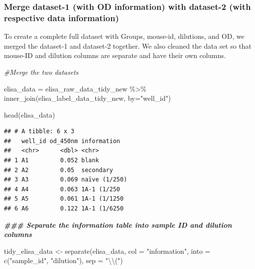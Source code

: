 \documentclass[
]{book}
\newenvironment{Shaded}{\begin{snugshade}}{\end{snugshade}}
\newcommand{\AttributeTok}[1]{\textcolor[rgb]{0.77,0.63,0.00}{#1}}
\newcommand{\CommentTok}[1]{\textcolor[rgb]{0.56,0.35,0.01}{\textit{#1}}}
\newcommand{\DocumentationTok}[1]{\textcolor[rgb]{0.56,0.35,0.01}{\textbf{\textit{#1}}}}
\newcommand{\FunctionTok}[1]{\textcolor[rgb]{0.00,0.00,0.00}{#1}}
\newcommand{\NormalTok}[1]{#1}
\newcommand{\OtherTok}[1]{\textcolor[rgb]{0.56,0.35,0.01}{#1}}
\newcommand{\SpecialCharTok}[1]{\textcolor[rgb]{0.00,0.00,0.00}{#1}}
\newcommand{\StringTok}[1]{\textcolor[rgb]{0.31,0.60,0.02}{#1}}
\begin{document}
\hypertarget{merge-dataset-1-with-od-information-with-dataset-2-with-respective-data-information}{%
\subsubsection{Merge dataset-1 (with OD information) with dataset-2 (with respective data information)}\label{merge-dataset-1-with-od-information-with-dataset-2-with-respective-data-information}}

To create a complete full dataset with Groups, mouse-id, dilutions, and OD, we merged the dataset-1 and dataset-2 together. We also cleaned the data set so that mouse-ID and dilution columns are separate and have their own columns.

\begin{Shaded}
\begin{Highlighting}[]
\CommentTok{\#Merge the two datasets}

\NormalTok{elisa\_data }\OtherTok{=}\NormalTok{ elisa\_raw\_data\_tidy\_new }\SpecialCharTok{\%\textgreater{}\%} \FunctionTok{inner\_join}\NormalTok{(elisa\_label\_data\_tidy\_new,}
                                                    \AttributeTok{by=}\StringTok{"well\_id"}\NormalTok{)}

\FunctionTok{head}\NormalTok{(elisa\_data)}
\end{Highlighting}
\end{Shaded}

\begin{verbatim}
## # A tibble: 6 x 3
##   well_id od_450nm information  
##   <chr>      <dbl> <chr>        
## 1 A1         0.052 blank        
## 2 A2         0.05  secondary    
## 3 A3         0.069 naïve (1/250)
## 4 A4         0.063 1A-1 (1/250  
## 5 A5         0.061 1A-1 (1/1250 
## 6 A6         0.122 1A-1 (1/6250
\end{verbatim}

\begin{Shaded}
\begin{Highlighting}[]
\DocumentationTok{\#\#\# Separate the information table into sample ID and dilution columns}

\NormalTok{tidy\_elisa\_data }\OtherTok{\textless{}{-}} \FunctionTok{separate}\NormalTok{(elisa\_data, }\AttributeTok{col =} \StringTok{"information"}\NormalTok{, }
                            \AttributeTok{into =} \FunctionTok{c}\NormalTok{(}\StringTok{"sample\_id"}\NormalTok{, }\StringTok{"dilution"}\NormalTok{),}
                            \AttributeTok{sep =} \StringTok{"}\SpecialCharTok{\textbackslash{}\textbackslash{}}\StringTok{("}\NormalTok{)}
\end{Highlighting}
\end{Shaded}
\end{document}
